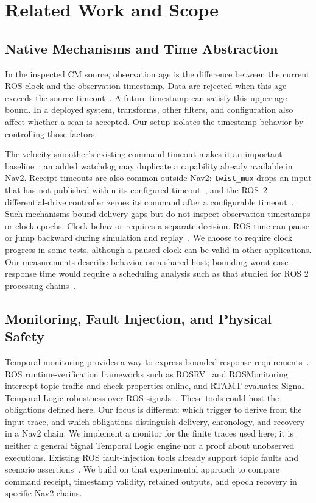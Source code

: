 \documentclass[conference]{IEEEtran}
\begin{document}
\section{Related Work and Scope}
\subsection{Native Mechanisms and Time Abstraction}
In the inspected CM source, observation age is the difference between the current ROS clock and the observation timestamp. Data are rejected when this age exceeds the source timeout~\cite{sourcecode}. A future timestamp can satisfy this upper-age bound. In a deployed system, transforms, other filters, and configuration also affect whether a scan is accepted. Our setup isolates the timestamp behavior by controlling those factors.

The velocity smoother's existing command timeout makes it an important baseline~\cite{smoother}: an added watchdog may duplicate a capability already available in Nav2. Receipt timeouts are also common outside Nav2: \texttt{twist\_mux} drops an input that has not published within its configured timeout~\cite{twistmux}, and the ROS~2 differential-drive controller zeroes its command after a configurable timeout~\cite{diffdrive}. Such mechanisms bound delivery gaps but do not inspect observation timestamps or clock epochs. Clock behavior requires a separate decision. ROS time can pause or jump backward during simulation and replay~\cite{rostime}. We choose to require clock progress in some tests, although a paused clock can be valid in other applications. Our measurements describe behavior on a shared host; bounding worst-case response time would require a scheduling analysis such as that studied for ROS 2 processing chains~\cite{casini_ros2}.

\subsection{Monitoring, Fault Injection, and Physical Safety}
Temporal monitoring provides a way to express bounded response requirements~\cite{maler_stl}. ROS runtime-verification frameworks such as ROSRV~\cite{rosrv} and ROSMonitoring~\cite{rosmonitoring} intercept topic traffic and check properties online, and RTAMT evaluates Signal Temporal Logic robustness over ROS signals~\cite{rtamt}. These tools could host the obligations defined here. Our focus is different: which trigger to derive from the input trace, and which obligations distinguish delivery, chronology, and recovery in a Nav2 chain. We implement a monitor for the finite traces used here; it is neither a general Signal Temporal Logic engine nor a proof about unobserved executions. Existing ROS fault-injection tools already support topic faults and scenario assertions~\cite{ros2_fi}. We build on that experimental approach to compare command receipt, timestamp validity, retained outputs, and epoch recovery in specific Nav2 chains.
\end{document}
